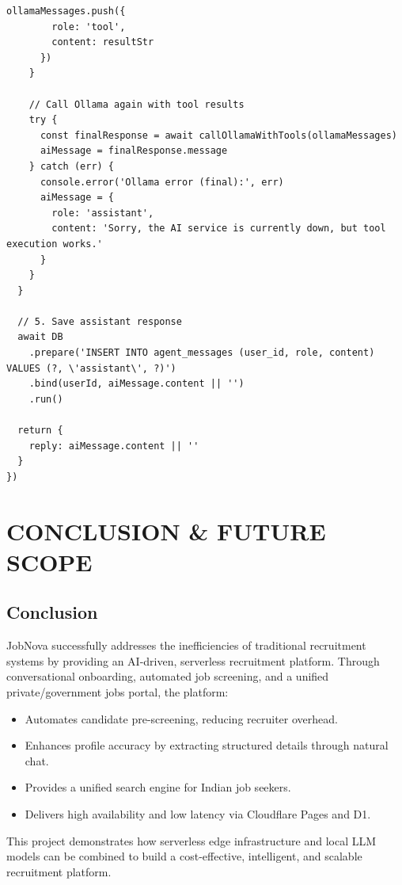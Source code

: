 \documentclass[12pt,a4paper]{report}
\begin{document}
\begin{lstlisting}[caption=Backend AI Job Agent API Route (agent.post.ts)]
      ollamaMessages.push({
        role: 'tool',
        content: resultStr
      })
    }

    // Call Ollama again with tool results
    try {
      const finalResponse = await callOllamaWithTools(ollamaMessages)
      aiMessage = finalResponse.message
    } catch (err) {
      console.error('Ollama error (final):', err)
      aiMessage = {
        role: 'assistant',
        content: 'Sorry, the AI service is currently down, but tool execution works.'
      }
    }
  }

  // 5. Save assistant response
  await DB
    .prepare('INSERT INTO agent_messages (user_id, role, content) VALUES (?, \'assistant\', ?)')
    .bind(userId, aiMessage.content || '')
    .run()

  return {
    reply: aiMessage.content || ''
  }
})

\end{lstlisting}




\chapter{CONCLUSION \& FUTURE SCOPE}

\section{Conclusion}

JobNova successfully addresses the inefficiencies of traditional recruitment systems by providing an AI-driven, serverless recruitment platform. Through conversational onboarding, automated job screening, and a unified private/government jobs portal, the platform:
\begin{itemize}
    \item Automates candidate pre-screening, reducing recruiter overhead.
    \item Enhances profile accuracy by extracting structured details through natural chat.
    \item Provides a unified search engine for Indian job seekers.
    \item Delivers high availability and low latency via Cloudflare Pages and D1.
\end{itemize}

This project demonstrates how serverless edge infrastructure and local LLM models can be combined to build a cost-effective, intelligent, and scalable recruitment platform.
\end{document}
